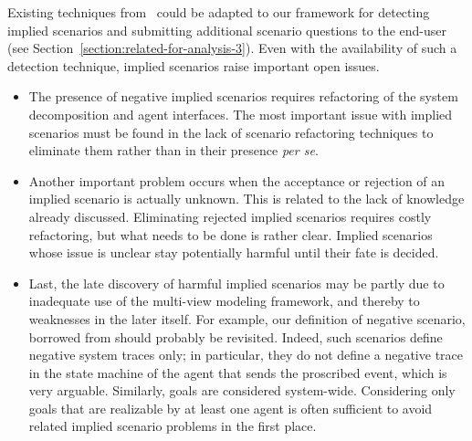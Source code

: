 Existing techniques from~\cite{Uchitel:2004} could be adapted to our framework for detecting implied scenarios and submitting additional scenario questions to the end-user (see Section~\ref{section:related-for-analysis-3}). Even with the availability of such a detection technique, implied scenarios raise important open issues.
\begin{itemize}
\item The presence of negative implied scenarios requires refactoring of the system decomposition and agent interfaces. The most important issue with implied scenarios must be found in the lack of scenario refactoring techniques to eliminate them rather than in their presence \emph{per se}.
\item Another important problem occurs when the acceptance or rejection of an implied scenario is actually unknown. This is related to the lack of knowledge already discussed. Eliminating rejected implied scenarios requires costly refactoring, but what needs to be done is rather clear. Implied scenarios whose issue is unclear stay potentially harmful until their fate is decided.
\item Last, the late discovery of harmful implied scenarios may be partly due to inadequate use of the multi-view modeling framework, and thereby to weaknesses in the later itself. For example, our definition of negative scenario, borrowed from \cite{Uchitel:2002} should probably be revisited. Indeed, such scenarios define negative system traces only; in particular, they do not define a negative trace in the state machine of the agent that sends the proscribed event, which is very arguable. Similarly, goals are considered system-wide. Considering only goals that are realizable by at least one agent is often sufficient to avoid related implied scenario problems in the first place.
\end{itemize}


